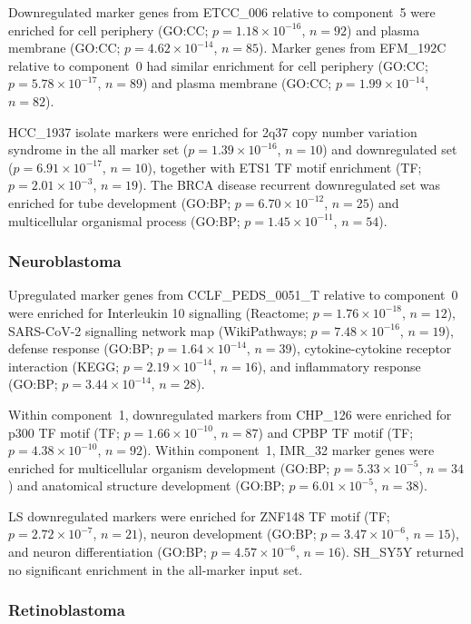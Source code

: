 Downregulated marker genes from ETCC\_006 relative to component~5 were enriched for cell periphery
(GO:CC; $p = 1.18 \times 10^{-16}$, $n = 92$) and plasma membrane
(GO:CC; $p = 4.62 \times 10^{-14}$, $n = 85$). Marker genes from
EFM\_192C relative to component~0 had similar
enrichment for cell periphery (GO:CC; $p = 5.78 \times 10^{-17}$,
$n = 89$) and plasma membrane (GO:CC; $p = 1.99 \times 10^{-14}$,
$n = 82$).

HCC\_1937 isolate markers were enriched for 2q37 copy number variation
syndrome in the all marker set ($p = 1.39 \times 10^{-16}$, $n = 10$)
and downregulated set ($p = 6.91 \times 10^{-17}$, $n = 10$), together
with ETS1 TF motif enrichment (TF; \(p = 2.01 \times 10^{-3}\),
\(n = 19\)). The BRCA
disease recurrent downregulated set was enriched for tube development
(GO:BP; $p = 6.70 \times 10^{-12}$, $n = 25$) and multicellular
organismal process (GO:BP; $p = 1.45 \times 10^{-11}$, $n = 54$).

\subsubsection{Neuroblastoma}

Upregulated marker genes from CCLF\_PEDS\_0051\_T relative to component~0 were enriched for Interleukin 10
signalling (Reactome; $p = 1.76 \times 10^{-18}$, $n = 12$), SARS-CoV-2
signalling network map (WikiPathways; $p = 7.48 \times 10^{-16}$,
$n = 19$), defense response (GO:BP; $p = 1.64 \times 10^{-14}$,
$n = 39$), cytokine-cytokine receptor interaction (KEGG;
$p = 2.19 \times 10^{-14}$, $n = 16$), and inflammatory response
(GO:BP; $p = 3.44 \times 10^{-14}$, $n = 28$).

Within component~1, downregulated markers from CHP\_126 were enriched for p300 TF motif
(TF; $p = 1.66 \times 10^{-10}$, $n = 87$) and CPBP TF motif
(TF; $p = 4.38 \times 10^{-10}$, $n = 92$). Within component~1, IMR\_32 marker genes were enriched for multicellular organism development
(GO:BP; $p = 5.33 \times 10^{-5}$, $n = 34$) and anatomical structure
development (GO:BP; $p = 6.01 \times 10^{-5}$, $n = 38$).

LS downregulated markers were enriched for ZNF148 TF motif (TF;
$p = 2.72 \times 10^{-7}$, $n = 21$), neuron development
(GO:BP; $p = 3.47 \times 10^{-6}$, $n = 15$), and neuron differentiation
(GO:BP; $p = 4.57 \times 10^{-6}$, $n = 16$). SH\_SY5Y returned no
significant enrichment in the all-marker input set.

\subsubsection{Retinoblastoma}

